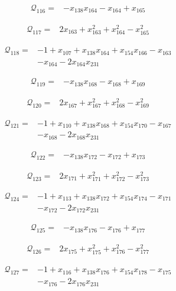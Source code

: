\begin{align*}
\mathcal{Q}_{116}={}&-x_{138}x_{164}-x_{164}+x_{165}
\end{align*}

\begin{align*}
\mathcal{Q}_{117}={}&2x_{163}+x_{163}^{2}+x_{164}^{2}-x_{165}^{2}
\end{align*}

\begin{align*}
\mathcal{Q}_{118}={}&-1+x_{107}+x_{138}x_{164}+x_{154}x_{166}-x_{163}\\
&-x_{164}-2x_{164}x_{231}
\end{align*}

\begin{align*}
\mathcal{Q}_{119}={}&-x_{138}x_{168}-x_{168}+x_{169}
\end{align*}

\begin{align*}
\mathcal{Q}_{120}={}&2x_{167}+x_{167}^{2}+x_{168}^{2}-x_{169}^{2}
\end{align*}

\begin{align*}
\mathcal{Q}_{121}={}&-1+x_{110}+x_{138}x_{168}+x_{154}x_{170}-x_{167}\\
&-x_{168}-2x_{168}x_{231}
\end{align*}

\begin{align*}
\mathcal{Q}_{122}={}&-x_{138}x_{172}-x_{172}+x_{173}
\end{align*}

\begin{align*}
\mathcal{Q}_{123}={}&2x_{171}+x_{171}^{2}+x_{172}^{2}-x_{173}^{2}
\end{align*}

\begin{align*}
\mathcal{Q}_{124}={}&-1+x_{113}+x_{138}x_{172}+x_{154}x_{174}-x_{171}\\
&-x_{172}-2x_{172}x_{231}
\end{align*}

\begin{align*}
\mathcal{Q}_{125}={}&-x_{138}x_{176}-x_{176}+x_{177}
\end{align*}

\begin{align*}
\mathcal{Q}_{126}={}&2x_{175}+x_{175}^{2}+x_{176}^{2}-x_{177}^{2}
\end{align*}

\begin{align*}
\mathcal{Q}_{127}={}&-1+x_{116}+x_{138}x_{176}+x_{154}x_{178}-x_{175}\\
&-x_{176}-2x_{176}x_{231}
\end{align*}

